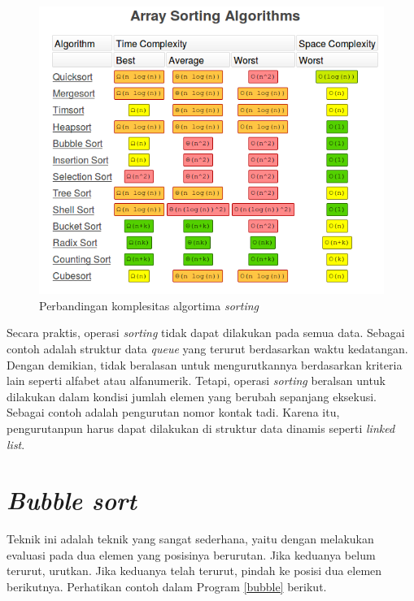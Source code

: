 \begin{figure}[H]
\centering
\includegraphics[scale=.5]{pics/ArraySorting.png}
\caption{Perbandingan komplesitas algortima \textit{sorting}}
\label{fig:sortingcomplex}
\end{figure}

Secara praktis, operasi \textit{sorting} tidak dapat dilakukan pada semua data. Sebagai contoh adalah struktur data \textit{queue} yang terurut berdasarkan waktu kedatangan. Dengan demikian, tidak beralasan untuk mengurutkannya berdasarkan kriteria lain seperti alfabet atau alfanumerik. Tetapi, operasi \textit{sorting} beralsan untuk dilakukan dalam kondisi jumlah elemen yang berubah sepanjang eksekusi. Sebagai contoh adalah pengurutan nomor kontak tadi. Karena itu, pengurutanpun harus dapat dilakukan di struktur data dinamis seperti \textit{linked list}. 

\section{\textit{Bubble sort}}
Teknik ini adalah teknik yang sangat sederhana, yaitu dengan melakukan evaluasi pada dua elemen yang posisinya berurutan. Jika keduanya belum terurut, urutkan. Jika keduanya telah terurut, pindah ke posisi dua elemen berikutnya. Perhatikan contoh dalam Program \ref{bubble} berikut.

\scriptsize

\normalsize

